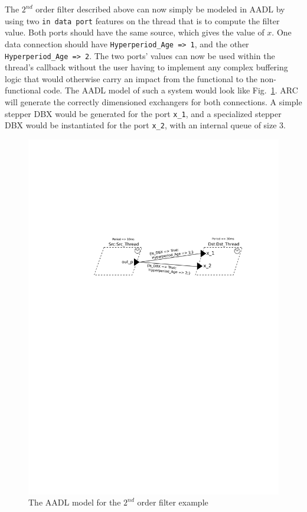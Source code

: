 The $2^{nd}$ order filter described above can now simply be modeled in
AADL by using two \texttt{in data port} features on the thread that is
to compute the filter value. Both ports should have the same source,
which gives the value of $x$. One data connection should have
\texttt{Hyperperiod\_Age => 1}, and the other \texttt{Hyperperiod\_Age
  => 2}. The two ports' values can now be used within the thread's
callback without the user having to implement any complex buffering
logic that would otherwise carry an impact from the functional to the
non-functional code. The AADL model of such a system would look like
Fig.~\ref{fig:ho-example}. ARC will generate the correctly dimensioned
exchangers for both connections. A simple stepper DBX would be
generated for the port \texttt{x\_1}, and a specialized stepper DBX
would be instantiated for the port \texttt{x\_2}, with an internal
queue of size 3.

\begin{figure}
\centering \includegraphics{figs/ho-example}
\caption{The AADL model for the $2^{nd}$ order filter example}
\label{fig:ho-example}
\end{figure}

